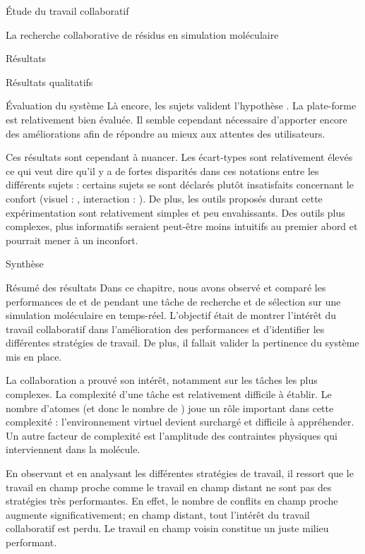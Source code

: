 \documentclass[myfrancais]{mythesis}
\begin{document}
\begin{mypart}{Étude du travail collaboratif}
\begin{mychapter}{La recherche collaborative de résidus en simulation moléculaire}
\begin{mysection}{Résultats}
\begin{mysubsection}{Résultats qualitatifs}
\begin{mysubsubsection}{Évaluation du système}
						Là encore, les sujets valident l'hypothèse .
						La plate-forme est relativement bien évaluée.
						Il semble cependant nécessaire d'apporter encore des améliorations afin de répondre au mieux aux attentes des utilisateurs.

						Ces résultats sont cependant à nuancer.
						Les écart-types sont relativement élevés ce qui veut dire qu'il y a de fortes disparités dans ces notations entre les différents sujets : certains sujets se sont déclarés plutôt insatisfaits concernant le confort (visuel : \mynum{2}, interaction : ).
						De plus, les outils proposés durant cette expérimentation sont relativement simples et peu envahissants.
						Des outils plus complexes, plus informatifs seraient peut-être moins intuitifs au premier abord et pourrait mener à un inconfort.
					\end{mysubsubsection}
				\end{mysubsection}
			\end{mysection}
			\begin{mysection}{Synthèse}
				\begin{mysubsection}{Résumé des résultats}
					Dans ce chapitre, nous avons observé et comparé les performances de  et de  pendant une tâche de recherche et de sélection sur une simulation moléculaire en temps-réel.
					L'objectif était de montrer l'intérêt du travail collaboratif dans l'amélioration des performances et d'identifier les différentes stratégies de travail.
					De plus, il fallait valider la pertinence du système mis en place.

					La collaboration a prouvé son intérêt, notamment sur les tâches les plus complexes.
					La complexité d'une tâche est relativement difficile à établir.
					Le nombre d'atomes (et donc le nombre de ) joue un rôle important dans cette complexité : l'environnement virtuel devient surchargé et difficile à appréhender.
					Un autre facteur de complexité est l'amplitude des contraintes physiques qui interviennent dans la molécule.

					En observant et en analysant les différentes stratégies de travail, il ressort que le travail en champ proche comme le travail en champ distant ne sont pas des stratégies très performantes.
					En effet, le nombre de conflits en champ proche augmente significativement; en champ distant, tout l'intérêt du travail collaboratif est perdu.
					Le travail en champ voisin constitue un juste milieu performant.


\end{mysubsection}
\end{mysection}
\end{mychapter}
\end{mypart}
\end{document}
